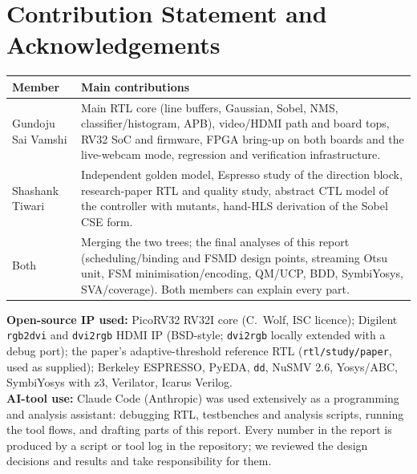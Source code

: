 \documentclass[11pt,a4paper]{article}
\newcommand{\studentA}{Gundoju Sai Vamshi}
\newcommand{\studentB}{Shashank Tiwari}
\begin{document}
\section*{Contribution Statement and Acknowledgements}
\label{sec:contrib}
\begin{table}[H]\centering\footnotesize
\begin{tabularx}{\linewidth}{@{}lX@{}}
\toprule
Member & Main contributions\\
\midrule
\studentA & Main RTL core (line buffers, Gaussian, Sobel, NMS, classifier/histogram, APB), video/HDMI path and board tops,
RV32 SoC and firmware, FPGA bring-up on both boards and the live-webcam mode, regression and verification infrastructure.\\
\studentB & Independent golden model, Espresso study of the direction block, research-paper RTL and quality study, abstract CTL
model of the controller with mutants, hand-HLS derivation of the Sobel CSE form.\\
Both & Merging the two trees; the final analyses of this report (scheduling/binding and FSMD design points, streaming Otsu unit,
FSM minimisation/encoding, QM/UCP, BDD, SymbiYosys, SVA/coverage). Both members can explain every part.\\
\bottomrule
\end{tabularx}
\end{table}
\textbf{Open-source IP used:} PicoRV32 RV32I core (C.~Wolf, ISC licence); Digilent \texttt{rgb2dvi} and \texttt{dvi2rgb} HDMI IP (BSD-style;
\texttt{dvi2rgb} locally extended with a debug port); the paper's adaptive-threshold reference RTL (\texttt{rtl/study/paper}, used as
supplied); Berkeley ESPRESSO, PyEDA, \texttt{dd}, NuSMV 2.6, Yosys/ABC, SymbiYosys with z3, Verilator, Icarus Verilog.\\
\textbf{AI-tool use:} Claude Code (Anthropic) was used extensively as a programming and analysis assistant: debugging RTL,
testbenches and analysis scripts, running the tool flows, and drafting parts of this report. Every number in the report is produced by a
script or tool log in the repository; we reviewed the design decisions and results and take responsibility for them.
\end{document}
